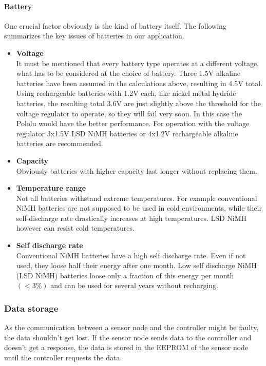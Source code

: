 \paragraph{Battery}
One crucial factor obviously is the kind of battery itself. The following summarizes the key issues of batteries in our application.
\begin{itemize}
\item \textbf{Voltage}\\
It must be mentioned that every battery type operates at a different voltage, what has to be considered at the choice of battery.
Three 1.5V alkaline batteries have been assumed in the calculations above, resulting in 4.5V total. Using rechargeable batteries with 1.2V each, like nickel metal hydride batteries, the resulting total 3.6V are just slightly above the threshold for the voltage regulator to operate, so they will fail very soon. In this case the Pololu would have the better performance. For operation with the voltage regulator 3x1.5V LSD NiMH batteries or 4x1.2V rechargeable alkaline batteries are recommended.

\item \textbf{Capacity}\\
Obviously batteries with higher capacity last longer without replacing them.

\item \textbf{Temperature range}\\
Not all batteries withstand extreme temperatures. For example conventional NiMH batteries are not supposed to be used in cold environments, while their self-discharge rate drastically increases at high temperatures. LSD NiMH however can resist cold temperatures.

\item \textbf{Self discharge rate}\\
Conventional NiMH batteries have a high self discharge rate. Even if not used, they loose half their energy after one month. Low self discharge NiMH (LSD NiMH) batteries loose only a fraction of this energy per month $(<3\%)$ and can be used for several years without recharging.
\end{itemize}



\subsubsection{Data storage}
As the communication between a sensor node and the controller might be faulty, the data shouldn't get lost. If the sensor node sends data to the controller and doesn't get a response, the data is stored in the EEPROM of the sensor node until the controller requests the data.


